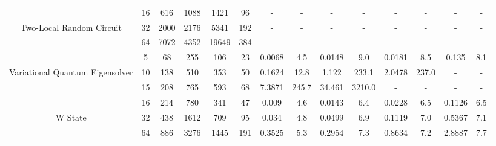 \begin{table}[htb]
{\begin{tabular}{|c|c|c|c|c|c|c|c|c|c|c|c|c|c|}
\hline
 & 
16 & 616 & 1088 & 1421 & 96
 & - & -
 & - & -
 & - & -
 & - & -
 \\
Two-Local Random Circuit & 
32 & 2000 & 2176 & 5341 & 192
 & - & -
 & - & -
 & - & -
 & - & -
 \\
 & 
64 & 7072 & 4352 & 19649 & 384
 & - & -
 & - & -
 & - & -
 & - & -
 \\
\hline
 & 
5 & 68 & 255 & 106 & 23
 & 0.0068 & 4.5
 & 0.0148 & 9.0
 & 0.0181 & 8.5
 & 0.135 & 8.1
 \\
Variational Quantum Eigensolver & 
10 & 138 & 510 & 353 & 50
 & 0.1624 & 12.8
 & 1.122 & 233.1
 & 2.0478 & 237.0
 & - & -
 \\
 & 
15 & 208 & 765 & 593 & 68
 & 7.3871 & 245.7
 & 34.461 & 3210.0
 & - & -
 & - & -
 \\
\hline
 & 
16 & 214 & 780 & 341 & 47
 & 0.009 & 4.6
 & 0.0143 & 6.4
 & 0.0228 & 6.5
 & 0.1126 & 6.5
 \\
W State & 
32 & 438 & 1612 & 709 & 95
 & 0.034 & 4.8
 & 0.0499 & 6.9
 & 0.1119 & 7.0
 & 0.5367 & 7.1
 \\
 & 
64 & 886 & 3276 & 1445 & 191
 & 0.3525 & 5.3
 & 0.2954 & 7.3
 & 0.8634 & 7.2
 & 2.8887 & 7.7
 \\
\hline
\end{tabular}}
\end{table}